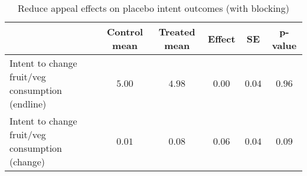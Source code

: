 \begin{table*}[ht]
\caption{Reduce appeal effects on placebo intent outcomes (with blocking)\label{round}} 
\begin{center}
\begin{tabular}{lccccc}
\hline\hline
\multicolumn{1}{l}{}&\multicolumn{1}{c}{Control mean}&\multicolumn{1}{c}{Treated mean}&\multicolumn{1}{c}{Effect}&\multicolumn{1}{c}{SE}&\multicolumn{1}{c}{p-value}\tabularnewline
\hline
Intent to change fruit/veg consumption (endline)&$5.00$&$4.98$&$0.00$&$0.04$&$0.96$\tabularnewline
Intent to change fruit/veg consumption (change)&$0.01$&$0.08$&$0.06$&$0.04$&$0.09$\tabularnewline
\hline
\end{tabular}\end{center}

\end{table*}
